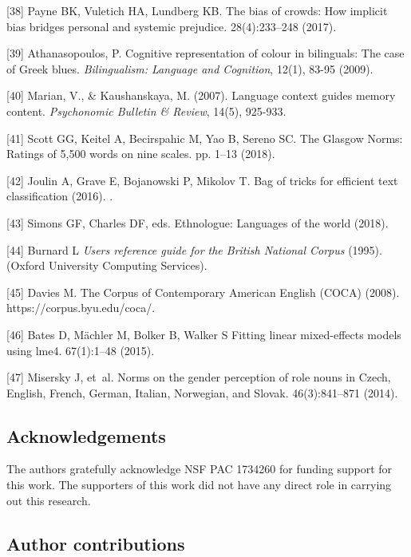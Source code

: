 \documentclass[9pt,twocolumn]{pnas-new}
\begin{document}
[38] Payne BK, Vuletich HA, Lundberg KB. The bias of crowds: How implicit bias
  bridges personal and systemic prejudice.
 28(4):233--248  (2017).

[39] Athanasopoulos, P. Cognitive representation of colour in bilinguals: The case of Greek blues. {\it Bilingualism: Language and Cognition}, 12(1), 83-95 (2009).

[40] Marian, V., \& Kaushanskaya, M. (2007). Language context guides memory content. {\it Psychonomic Bulletin \& Review}, 14(5), 925-933.

[41] Scott GG, Keitel A, Becirspahic M, Yao B, Sereno SC. The {G}lasgow
  {N}orms: Ratings of 5,500 words on nine scales.
 pp. 1--13 (2018).

[42] Joulin A, Grave E, Bojanowski P, Mikolov T. Bag of tricks for efficient
  text classification (2016).
.

[43] Simons GF, Charles DF, eds. Ethnologue: Languages of the world (2018).

[44] Burnard L  {\em Users reference guide for the British National Corpus} (1995).
\newblock (Oxford University Computing Services).

[45] Davies M. The {C}orpus of {C}ontemporary {A}merican {E}nglish ({COCA}) (2008).
\newblock https://corpus.byu.edu/coca/.

[46] Bates D, M{\"a}chler M, Bolker B, Walker S  Fitting linear mixed-effects
  models using {lme4}.
 67(1):1--48 (2015).

[47] Misersky J, et~al.  Norms on the gender perception of role nouns in
  {C}zech, {E}nglish, {F}rench, {G}erman, {I}talian, {N}orwegian, and {S}lovak.
 46(3):841--871 (2014).


\subsection*{Acknowledgements}

The authors gratefully acknowledge NSF PAC 1734260 for funding support for this work. The supporters of this work did not have any direct role in carrying out this research.

\subsection*{Author contributions}
\end{document}
